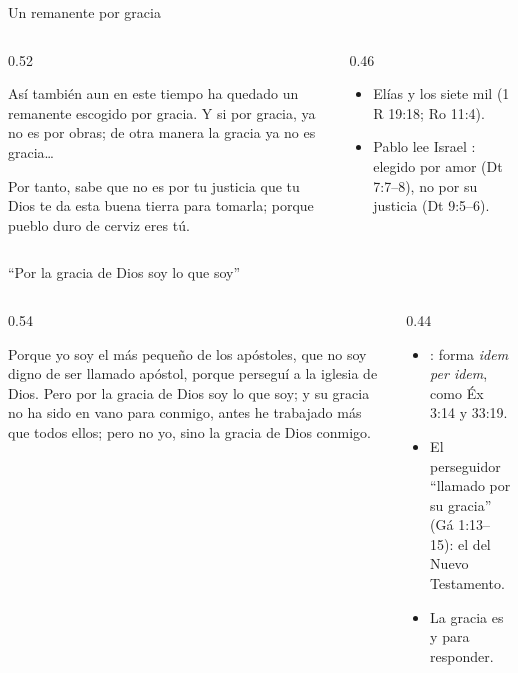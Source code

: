 \begin{frame}{Un remanente por gracia}
\begin{columns}[c,onlytextwidth]
\begin{column}{0.52\textwidth}
\begin{cita}Así también aun en este tiempo ha quedado un remanente escogido por gracia. Y si por gracia, ya no es por obras; de otra manera la gracia ya no es gracia\ldots{}\end{cita}
\begin{cita}Por tanto, sabe que no es por tu justicia que \SENOR{} tu Dios te da esta buena tierra para tomarla; porque pueblo duro de cerviz eres tú.\end{cita}
\end{column}
\begin{column}{0.46\textwidth}\small\RaggedRight
\begin{itemize}
\item Elías y los siete mil (1 R 19:18; Ro 11:4).
\item Pablo lee Israel : elegido por amor (Dt 7:7--8), no por su justicia (Dt 9:5--6).
\end{itemize}
\end{column}
\end{columns}
\end{frame}

\begin{frame}{``Por la gracia de Dios soy lo que soy''}
\begin{columns}[c,onlytextwidth]
\begin{column}{0.54\textwidth}
\begin{cita}Porque yo soy el más pequeño de los apóstoles, que no soy digno de ser llamado apóstol, porque perseguí a la iglesia de Dios. Pero por la gracia de Dios soy lo que soy; y su gracia no ha sido en vano para conmigo, antes he trabajado más que todos ellos; pero no yo, sino la gracia de Dios conmigo.\end{cita}
\end{column}
\begin{column}{0.44\textwidth}\small\RaggedRight
\begin{itemize}
\item {}: forma \emph{idem per idem}, como Éx 3:14 y 33:19.
\item El perseguidor ``llamado por su gracia'' (Gá 1:13--15): el  del Nuevo Testamento.
\item La gracia es  y  para responder.
\end{itemize}
\end{column}
\end{columns}
\end{frame}

